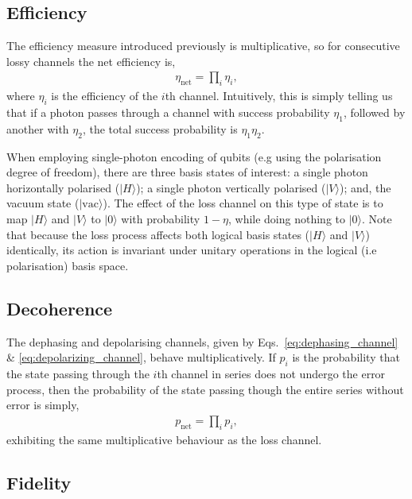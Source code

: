 \documentclass[aps,rmp,twocolumn,amsmath,amssymb,nofootinbib,superscriptaddress]{revtex4}
\newcommand{\ket}[1]{|#1\rangle}
\begin{document}
%
%

\subsection{Efficiency}

The efficiency measure introduced previously is multiplicative, so for consecutive lossy channels the net efficiency is,
\begin{align}
\eta_\mathrm{net}=\prod_i \eta_i,
\end{align}
where $\eta_i$ is the efficiency of the $i$th channel. Intuitively, this is simply telling us that if a photon passes through a channel with success probability $\eta_1$, followed by another with $\eta_2$, the total success probability is \mbox{$\eta_1\eta_2$}.

When employing single-photon encoding of qubits (e.g using the polarisation degree of freedom), there are three basis states of interest: a single photon horizontally polarised ($\ket{H}$); a single photon vertically polarised ($\ket{V}$); and, the vacuum state ($\ket{\mathrm{vac}}$). The effect of the loss channel on this type of state is to map $\ket{H}$ and $\ket{V}$ to $\ket{\mathrm{0}}$ with probability \mbox{$1-\eta$}, while doing nothing to $\ket{\mathrm{0}}$. Note that because the loss process affects both logical basis states ($\ket{H}$ and $\ket{V}$) identically, its action is invariant under unitary operations in the logical (i.e polarisation) basis space.

%
%

\subsection{Decoherence}

The dephasing and depolarising channels, given by Eqs.~\ref{eq:dephasing_channel} \& \ref{eq:depolarizing_channel}, behave multiplicatively. If $p_i$ is the probability that the state passing through the $i$th channel in series does not undergo the error process, then the probability of the state passing though the entire series without error is simply,
\begin{align}
p_\mathrm{net}=\prod_i p_i,
\end{align}
exhibiting the same multiplicative behaviour as the loss channel.

%
%

\subsection{Fidelity} \label{sec:fid_metric}
\end{document}
